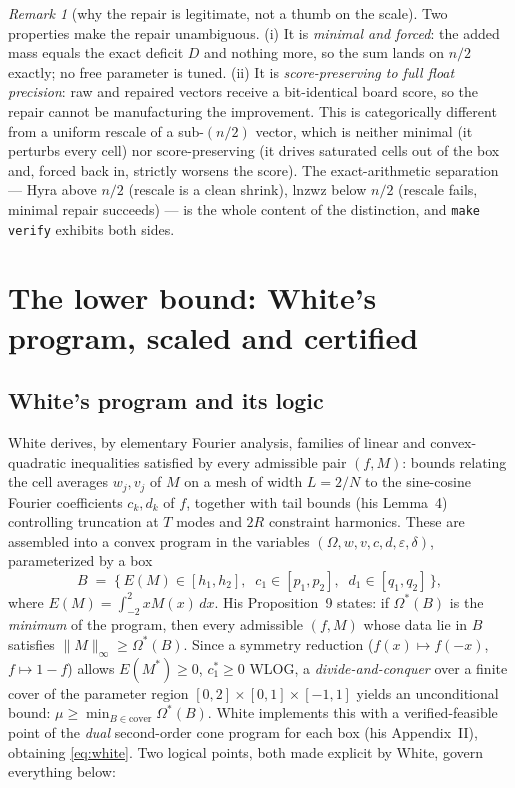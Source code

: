 \documentclass[11pt]{article}
\theoremstyle{remark}
\newtheorem{remark}[theorem]{Remark}
\newcommand{\eps}{\varepsilon}
\newcommand{\supnorm}[1]{\lVert #1 \rVert_\infty}
\begin{document}
\begin{remark}[why the repair is legitimate, not a thumb on the scale]
\label{rem:repair}
Two properties make the repair unambiguous. (i) It is \emph{minimal and forced}:
the added mass equals the exact deficit $D$ and nothing more, so the sum lands on
$n/2$ exactly; no free parameter is tuned. (ii) It is \emph{score-preserving to
full float precision}: raw and repaired vectors receive a bit-identical board
score, so the repair cannot be manufacturing the improvement. This is
categorically different from a uniform rescale of a sub-$(n/2)$ vector, which is
neither minimal (it perturbs every cell) nor score-preserving (it drives
saturated cells out of the box and, forced back in, strictly worsens the score).
The exact-arithmetic separation --- Hyra above $n/2$ (rescale is a clean shrink),
lnzwz below $n/2$ (rescale fails, minimal repair succeeds) --- is the whole
content of the distinction, and \texttt{make verify} exhibits both sides.
\end{remark}

\section{The lower bound: White's program, scaled and certified}
\label{sec:lower}

\subsection{White's program and its logic}\label{sec:whiteprog}

White \cite[\S3--\S5]{White22} derives, by elementary Fourier analysis,
families of linear and convex-quadratic inequalities satisfied by every
admissible pair $(f, M)$: bounds relating the cell averages
$w_j, v_j$ of $M$ on a mesh of width $L = 2/N$ to the sine-cosine Fourier
coefficients $c_k, d_k$ of $f$, together with tail bounds
(his Lemma~4) controlling truncation at $T$ modes and $2R$ constraint
harmonics. These are assembled into a convex program
\cite[p.~12, constraints (5.1)--(5.13)]{White22} in the variables
$(\Omega, w, v, c, d, \eps, \delta)$, parameterized by a box
\[
B \;=\; \bigl\{\, E(M) \in [h_1, h_2],\;\; c_1 \in [p_1, p_2],\;\;
d_1 \in [q_1, q_2] \,\bigr\},
\]
where $E(M) = \int_{-2}^{2} x M(x)\,dx$. His Proposition~9 states: if
$\Omega^\ast(B)$ is the \emph{minimum} of the program, then every admissible
$(f, M)$ whose data lie in $B$ satisfies $\supnorm{M} \ge \Omega^\ast(B)$.
Since a symmetry reduction ($f(x) \mapsto f(-x)$, $f \mapsto 1-f$) allows
$E(M^\ast) \ge 0$, $c_1^\ast \ge 0$ WLOG, a \emph{divide-and-conquer} over a
finite cover of the parameter region $[0,2]\times[0,1]\times[-1,1]$ yields an
unconditional bound: $\mu \ge \min_{B \in \mathrm{cover}} \Omega^\ast(B)$.
White implements this with a verified-feasible point of the \emph{dual}
second-order cone program for each box (his Appendix~II), obtaining
\eqref{eq:white}. Two logical points, both made explicit by White, govern
everything below:
\end{document}
